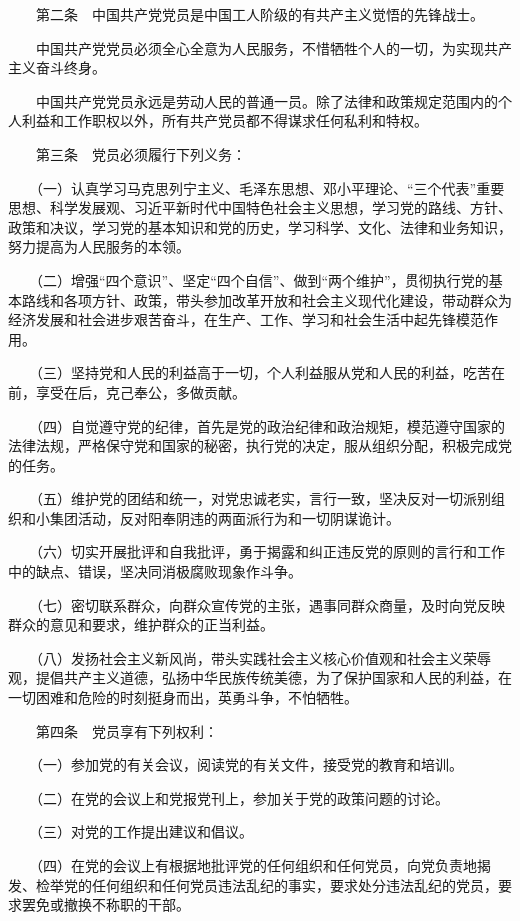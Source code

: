 　　第二条　中国共产党党员是中国工人阶级的有共产主义觉悟的先锋战士。

　　中国共产党党员必须全心全意为人民服务，不惜牺牲个人的一切，为实现共产主义奋斗终身。

　　中国共产党党员永远是劳动人民的普通一员。除了法律和政策规定范围内的个人利益和工作职权以外，所有共产党员都不得谋求任何私利和特权。

　　第三条　党员必须履行下列义务：

　　（一）认真学习马克思列宁主义、毛泽东思想、邓小平理论、“三个代表”重要思想、科学发展观、习近平新时代中国特色社会主义思想，学习党的路线、方针、政策和决议，学习党的基本知识和党的历史，学习科学、文化、法律和业务知识，努力提高为人民服务的本领。

　　（二）增强“四个意识”、坚定“四个自信”、做到“两个维护”，贯彻执行党的基本路线和各项方针、政策，带头参加改革开放和社会主义现代化建设，带动群众为经济发展和社会进步艰苦奋斗，在生产、工作、学习和社会生活中起先锋模范作用。

　　（三）坚持党和人民的利益高于一切，个人利益服从党和人民的利益，吃苦在前，享受在后，克己奉公，多做贡献。

　　（四）自觉遵守党的纪律，首先是党的政治纪律和政治规矩，模范遵守国家的法律法规，严格保守党和国家的秘密，执行党的决定，服从组织分配，积极完成党的任务。

　　（五）维护党的团结和统一，对党忠诚老实，言行一致，坚决反对一切派别组织和小集团活动，反对阳奉阴违的两面派行为和一切阴谋诡计。

　　（六）切实开展批评和自我批评，勇于揭露和纠正违反党的原则的言行和工作中的缺点、错误，坚决同消极腐败现象作斗争。

　　（七）密切联系群众，向群众宣传党的主张，遇事同群众商量，及时向党反映群众的意见和要求，维护群众的正当利益。

　　（八）发扬社会主义新风尚，带头实践社会主义核心价值观和社会主义荣辱观，提倡共产主义道德，弘扬中华民族传统美德，为了保护国家和人民的利益，在一切困难和危险的时刻挺身而出，英勇斗争，不怕牺牲。

　　第四条　党员享有下列权利：

　　（一）参加党的有关会议，阅读党的有关文件，接受党的教育和培训。

　　（二）在党的会议上和党报党刊上，参加关于党的政策问题的讨论。

　　（三）对党的工作提出建议和倡议。

　　（四）在党的会议上有根据地批评党的任何组织和任何党员，向党负责地揭发、检举党的任何组织和任何党员违法乱纪的事实，要求处分违法乱纪的党员，要求罢免或撤换不称职的干部。

